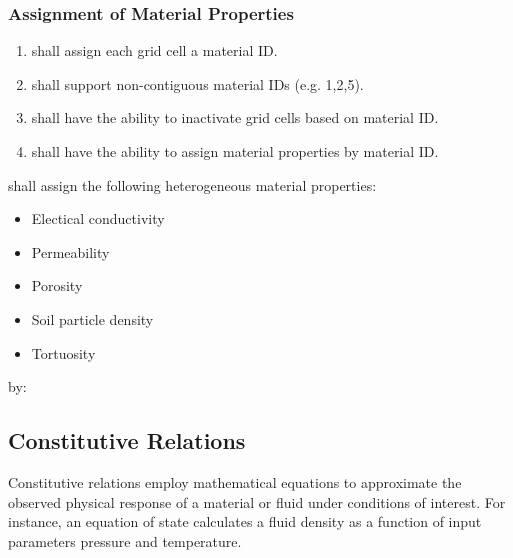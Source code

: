 \subsubsection{Assignment of Material Properties}
\begin{enumerate} [resume]
	\item \pft shall assign each grid cell a material ID.
	\item \pft shall support non-contiguous material IDs (e.g. 1,2,5).
	\item \pft shall have the ability to inactivate grid cells based on material ID.
	\item \pft shall have the ability to assign material properties by material ID.
\end{enumerate}
\vspace{0.25cm}
\noindent\pft shall assign the following heterogeneous material properties:
\begin{itemize}[label=\pftitemlabel]
	\item \label{mp_electrical_conductivity} Electical conductivity
	\item \label{mp_permeability} Permeability
	\item \label{mp_porosity} Porosity
	\item \label{mp_soil_particle_density} Soil particle density
	\item \label{mp_tortuosity} Tortuosity
\end{itemize}
by:
\begin{enumerate}[resume]
	\assignbyregion  \label{repMatPropRegions}
	\assignbycoordinate \label{repMatPropLocation}
	\assignbycellid \label{repMatPropCellID}
\end{enumerate}

\subsection{Constitutive Relations}
Constitutive relations employ mathematical equations to approximate the observed physical response of a material or fluid under conditions of interest. 
For instance, an equation of state calculates a fluid density as a function of input parameters pressure and temperature.

